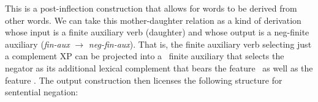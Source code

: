 \documentclass[output=paper]{langsci/langscibook}
\begin{document}
{\begin{exe}
\begin{xlist}
\begin{exe}
\begin{xlist}
\z

%
This is a post-inflection construction that allows for words to
be derived from other words. We can take this mother-daughter relation as a kind of derivation whose input is a finite auxiliary verb (daughter)
and whose output is a neg-finite auxiliary ({\it fin-aux} $\rightarrow$ {\it neg-fin-aux}). That is, the finite auxiliary verb selecting just a
complement XP can be projected into a \NEG\ finite auxiliary that selects the negator
as its additional lexical complement that bears the feature \NEG\ as well
as the feature \LEX.
%
%
The output construction then licenses the following structure for
sentential negation:


\ea
\z



\end{xlist}
\end{exe}
\end{xlist}
\end{exe}}
\end{document}
